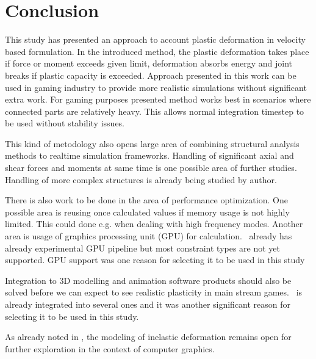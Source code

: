 \section{Conclusion}

This study has presented an approach to account plastic deformation in 
velocity based formulation.
In the introduced method, the plastic deformation takes place if force or moment exceeds given 
limit, deformation absorbs energy and joint breaks if plastic capacity is exceeded. 
Approach presented in this work can be used in gaming industry to provide more realistic 
simulations without significant extra work. 
For gaming purposes presented method works 
best in scenarios where connected parts are relatively heavy. This allows normal 
integration timestep to be used without stability issues. 

This kind of metodology also opens large area of combining  structural analysis
methods to realtime simulation frameworks.
Handling of significant axial and shear forces and moments at same time
is one possible area of further studies.
Handling of more complex structures is already being studied by author.

There is also work to be done in the area of performance optimization.
One possible area is reusing once calculated values if memory usage is not highly limited.
This could done e.g. when dealing with high frequency modes.
Another area is usage of graphics processing unit (GPU) for calculation.
\bullet\ already has already experimental GPU pipeline but most constraint types are not 
yet supported. GPU support was one reason for selecting
it to be used in this study

Integration to 3D modelling and animation software products 
should also be solved before we can expect to
see realistic plasticity in main stream games. 
\bullet\ is already integrated into several ones and it was another significant reason for selecting
it to be used in this study.

As already noted in \cite{cg1988}, the modeling of inelastic deformation
remains open for further exploration in the context of computer graphics.

